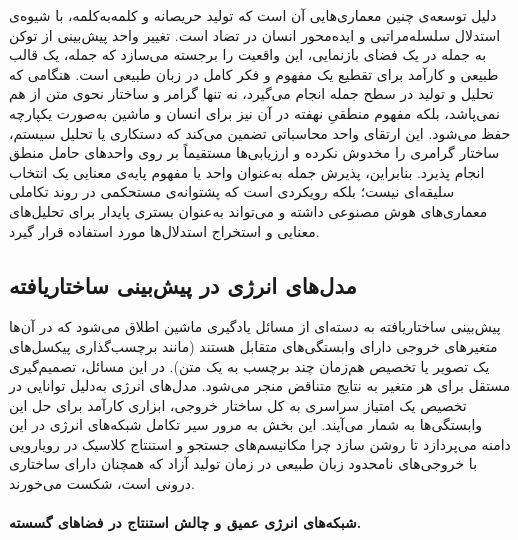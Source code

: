 دلیل توسعه‌ی چنین معماری‌هایی آن است که تولید حریصانه و کلمه‌به‌کلمه، با شیوه‌ی استدلال سلسله‌مراتبی و ایده‌محور انسان در تضاد است. تغییر واحد پیش‌بینی از توکن به جمله در یک فضای بازنمایی، این واقعیت را برجسته می‌سازد که جمله، یک قالب طبیعی و کارآمد برای تقطیع یک مفهوم و فکر کامل در زبان طبیعی است. هنگامی که تحلیل و تولید در سطح جمله انجام می‌گیرد، نه تنها گرامر و ساختار نحوی متن از هم نمی‌پاشد، بلکه مفهوم منطقیِ نهفته در آن نیز برای انسان و ماشین به‌صورت یکپارچه حفظ می‌شود. این ارتقای واحد محاسباتی تضمین می‌کند که دستکاری یا تحلیل سیستم، ساختار گرامری را مخدوش نکرده و ارزیابی‌ها مستقیماً بر روی واحدهای حامل منطق انجام پذیرد. بنابراین، پذیرش جمله به‌عنوان واحد یا مفهوم پایه‌ی معنایی یک انتخاب سلیقه‌ای نیست؛ بلکه رویکردی است که پشتوانه‌ی مستحکمی در روند تکاملی معماری‌های هوش مصنوعی داشته و می‌تواند به‌عنوان بستری پایدار برای تحلیل‌های معنایی و استخراج استدلال‌ها مورد استفاده قرار گیرد.


\subsection{مدل‌های انرژی در پیش‌بینی ساختاریافته}\label{sec:3-2-2}

پیش‌بینی ساختاریافته به دسته‌ای از مسائل یادگیری ماشین اطلاق می‌شود که در آن‌ها متغیرهای خروجی دارای وابستگی‌های متقابل هستند (مانند برچسب‌گذاری پیکسل‌های یک تصویر یا تخصیص هم‌زمان چند برچسب به یک متن). در این مسائل، تصمیم‌گیری مستقل برای هر متغیر به نتایج متناقض منجر می‌شود. مدل‌های انرژی به‌دلیل توانایی در تخصیص یک امتیاز سراسری به کل ساختار خروجی، ابزاری کارآمد برای حل این وابستگی‌ها به شمار می‌آیند. این بخش به مرور سیر تکامل شبکه‌های انرژی در این دامنه می‌پردازد تا روشن سازد چرا مکانیسم‌های جستجو و استنتاج کلاسیک در رویارویی با خروجی‌های نامحدود زبان طبیعی در زمان تولید آزاد که همچنان دارای ساختاری درونی است، شکست می‌خورند.


\paragraph{شبکه‌های انرژی عمیق و چالش استنتاج در فضاهای گسسته.}

